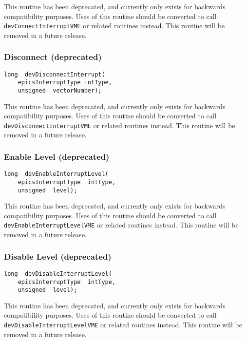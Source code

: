 This routine has been deprecated, and currently only exists for backwards compatibility purposes. Uses of this routine 
should be converted to call \verb|devConnectInterruptVME| or related routines instead. This routine will be removed in a 
future release.

\subsubsection{Disconnect (deprecated)}

\begin{verbatim}
long  devDisconnectInterrupt(
    epicsInterruptType intType,
    unsigned  vectorNumber);
\end{verbatim}

This routine has been deprecated, and currently only exists for backwards compatibility purposes. Uses of this routine 
should be converted to call \verb|devDisconnectInterruptVME| or related routines instead. This routine will be removed 
in a future release.

\subsubsection{Enable Level (deprecated)}

\begin{verbatim}
long  devEnableInterruptLevel(
    epicsInterruptType  intType,
    unsigned  level);
\end{verbatim}

This routine has been deprecated, and currently only exists for backwards compatibility purposes. Uses of this routine 
should be converted to call \verb|devEnableInterruptLevelVME| or related routines instead. This routine will be removed 
in a future release.

\subsubsection{Disable Level (deprecated)}

\begin{verbatim}
long  devDisableInterruptLevel(
    epicsInterruptType  intType,
    unsigned  level);
\end{verbatim}

This routine has been deprecated, and currently only exists for backwards compatibility purposes. Uses of this routine 
should be converted to call \verb|devDisableInterruptLevelVME| or related routines instead. This routine will be 
removed in a future release.

